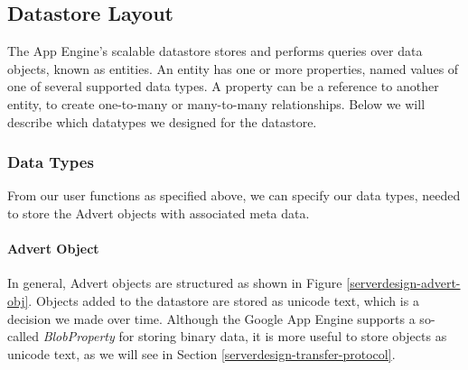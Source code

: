 %

\subsection{Datastore Layout}
\label{serverdesign-datastore}
The App Engine's scalable datastore stores and performs queries over data
objects, known as entities. An entity has one or more properties, named values of one of
several supported data types. A property can be a reference to another entity, to
create one-to-many or many-to-many relationships. Below we will describe which
datatypes we designed for the datastore.

\subsubsection{Data Types}
From our user functions as specified above, we can specify our data types,
needed to store the Advert objects with associated meta data.

\paragraph{Advert Object}
In general, Advert objects are structured as shown in Figure
\ref{serverdesign-advert-obj}. Objects added to the datastore are stored as
unicode text, which is a decision we made over time. Although the Google App
Engine supports a so-called \emph{BlobProperty} for storing binary data, it is
more useful to store objects as unicode text, as we will see in Section
\ref{serverdesign-transfer-protocol}.

